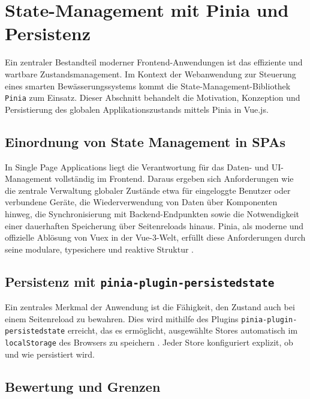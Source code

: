 \section{State-Management mit Pinia und Persistenz}
\label{chap:pinia}

Ein zentraler Bestandteil moderner Frontend-Anwendungen ist das effiziente und wartbare Zustandsmanagement. Im Kontext der Webanwendung zur Steuerung eines smarten Bewässerungssystems kommt die State-Management-Bibliothek \texttt{Pinia} zum Einsatz. Dieser Abschnitt behandelt die Motivation, Konzeption und Persistierung des globalen Applikationszustands mittels Pinia in Vue.js.

\subsection{Einordnung von State Management in SPAs}

In Single Page Applications liegt die Verantwortung für das Daten- und UI-Management vollständig im Frontend. Daraus ergeben sich Anforderungen wie die zentrale Verwaltung globaler Zustände etwa für eingeloggte Benutzer oder verbundene Geräte, die Wiederverwendung von Daten über Komponenten hinweg, die Synchronisierung mit Backend-Endpunkten sowie die Notwendigkeit einer dauerhaften Speicherung über Seitenreloads hinaus. Pinia, als moderne und offizielle Ablösung von Vuex in der Vue-3-Welt, erfüllt diese Anforderungen durch seine modulare, typesichere und reaktive Struktur \cite{Vuex} \cite{Allotey2023}.



\subsection{Persistenz mit \texttt{pinia-plugin-persistedstate}}

Ein zentrales Merkmal der Anwendung ist die Fähigkeit, den Zustand auch bei einem Seitenreload zu bewahren. Dies wird mithilfe des Plugins \texttt{pinia-plugin-persistedstate} erreicht, das es ermöglicht, ausgewählte Stores automatisch im \texttt{localStorage} des Browsers zu speichern \cite{VueMastery2023}. Jeder Store konfiguriert explizit, ob und wie persistiert wird.



\subsection{Bewertung und Grenzen}

